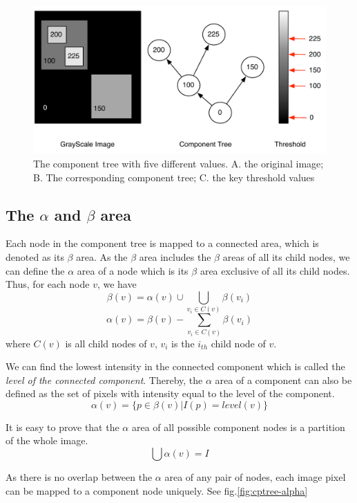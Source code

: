 \begin{figure}[htbp]
\centering
\includegraphics[width=1.0\textwidth]{images/cptree_example}
\caption[An example of component tree with four levels and five components]{The component tree with five different values. A. the original image; B. The corresponding component tree; C. the key threshold values}
\label{fig:cptree-example}
\end{figure}
\subsection{The $\alpha$ and $\beta$ area}
Each node in the component tree is mapped to a connected area, which is denoted as its $\beta$ area. As the $\beta$ area includes the $\beta$ areas of all its child nodes, we can define the $\alpha$ area of a node which is its $\beta$ area exclusive of all its child nodes. Thus, for each node $v$, we have
$$
\beta(v) = \alpha(v)\cup\bigcup_{v_i \in C(v)} \beta(v_i)   
$$
$$
\alpha(v) = \beta(v) - \sum_{v_i\in C(v)}\beta(v_i)
$$
where $C(v)$ is all child nodes of $v$, $v_i$ is the $i_{th}$ child node of $v$. 

We can find the lowest intensity in the connected component which is called the \emph{level of the connected component}. Thereby, the $\alpha$ area of a component can also be defined as the set of pixels with intensity equal to the level of the component.
$$
\alpha(v) = \{p \in \beta(v)| I(p) = level(v)\}
$$

It is easy to prove that the $\alpha$ area of all possible component nodes is a partition of the whole image.
$$
\bigcup \alpha(v) = I
$$

As there is no overlap between the $\alpha$ area of any pair of nodes, each image pixel can be mapped to a component node uniquely. See fig.\ref{fig:cptree-alpha}

